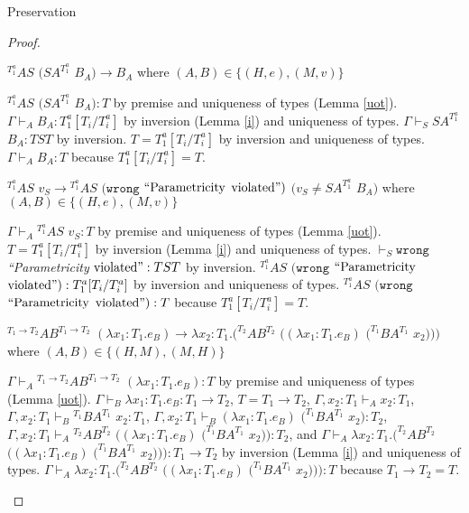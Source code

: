 \begin{theorem}{Preservation}
\begin{proof}

\begin{case}
$^{T_{1}^{a}}AS$ $(SA^{T_{1}^{a}}$ $B_{A})\rightarrow B_{A}$ where $(A,B)\in\lbrace(H,e),(M,v)\rbrace$

$^{T_{1}^{a}}AS$ $(SA^{T_{1}^{a}}$ $B_{A}):T$ by premise and uniqueness of types (Lemma \ref{uot}).  $\Gamma\vdash_{A}B_{A}:T_{1}^{a}[T_{i}/T_{i}^{a}]$ by inversion (Lemma \ref{i}) and uniqueness of types.  $\Gamma\vdash_{S}SA^{T_{1}^{a}}$ $B_{A}:TST$ by inversion.  $T=T_{1}^{a}[T_{i}/T_{i}^{a}]$ by inversion and uniqueness of types.  $\Gamma\vdash_{A}B_{A}:T$ because $T_{1}^{a}[T_{i}/T_{i}^{a}]=T$.
\end{case}


\begin{case}
$^{T_{1}^{a}}AS$ $v_{S}\rightarrow{^{T_{1}^{a}}A}S$ $(\mathtt{wrong}$ $\mathrm{``Parametricity}$ $\mathrm{violated"})$ $(v_{S}\neq SA^{T_{1}^{a}}$ $B_{A})$ where $(A,B)\in\lbrace(H,e),(M,v)\rbrace$

$\Gamma\vdash_{A}{^{T_{1}^{a}}A}S$ $v_{S}:T$ by premise and uniqueness of types (Lemma \ref{uot}).  $T=T_{1}^{a}[T_{i}/T_{i}^{a}]$ by inversion (Lemma \ref{i}) and uniqueness of types.  $\vdash_{S}\mathtt{wrong}$ \emph{``Parametricity} $\mathrm{violated"}:TST$ by inversion.  $^{T_{1}^{a}}AS$ $(\mathtt{wrong}$ $\mathrm{``Parametricity}$ $\mathrm{violated"}):T_{1}^{a}[T_{i}/T_{i}^{a}]$ by inversion and uniqueness of types.  $^{T_{1}^{a}}AS$ $(\mathtt{wrong}$ $\mathrm{``Parametricity}$ $\mathrm{violated"}):T$ because $T_{1}^{a}[T_{i}/T_{i}^{a}]=T$.
\end{case}


\begin{case}
$^{T_{1}\rightarrow T_{2}}AB^{T_{1}\rightarrow T_{2}}$ $(\lambda x_{1}:T_{1}.e_{B})\rightarrow\lambda x_{2}:T_{1}.(^{T_{2}}AB^{T_{2}}$ $((\lambda x_{1}:T_{1}.e_{B})$ $(^{T_{1}}BA^{T_{1}}$ $x_{2})))$ where $(A,B)\in\lbrace(H,M),(M,H)\rbrace$

$\Gamma\vdash_{A}{^{T_{1}\rightarrow T_{2}}}AB^{T_{1}\rightarrow T_{2}}$ $(\lambda x_{1}:T_{1}.e_{B}):T$ by premise and uniqueness of types (Lemma \ref{uot}).  $\Gamma\vdash_{B}\lambda x_{1}:T_{1}.e_{B}:T_{1}\rightarrow T_{2}$, $T=T_{1}\rightarrow T_{2}$, $\Gamma,x_{2}:T_{1}\vdash_{A}x_{2}:T_{1}$, $\Gamma,x_{2}:T_{1}\vdash_{B}{^{T_{1}}B}A^{T_{1}}$ $x_{2}:T_{1}$, $\Gamma,x_{2}:T_{1}\vdash_{B}(\lambda x_{1}:T_{1}.e_{B})$ $(^{T_{1}}BA^{T_{1}}$ $x_{2}):T_{2}$, $\Gamma,x_{2}:T_{1}\vdash_{A}{^{T_{2}}A}B^{T_{2}}$ $((\lambda x_{1}:T_{1}.e_{B})$ $(^{T_{1}}BA^{T_{1}}$ $x_{2})):T_{2}$, and $\Gamma\vdash_{A}\lambda x_{2}:T_{1}.(^{T_{2}}AB^{T_{2}}$ $((\lambda x_{1}:T_{1}.e_{B})$ $(^{T_{1}}BA^{T_{1}}$ $x_{2}))):T_{1}\rightarrow T_{2}$ by inversion (Lemma \ref{i}) and uniqueness of types.  $\Gamma\vdash_{A}\lambda x_{2}:T_{1}.(^{T_{2}}AB^{T_{2}}$ $((\lambda x_{1}:T_{1}.e_{B})$ $(^{T_{1}}BA^{T_{1}}$ $x_{2}))):T$ because $T_{1}\rightarrow T_{2}=T$.
\end{case}


\end{proof}
\end{theorem}
